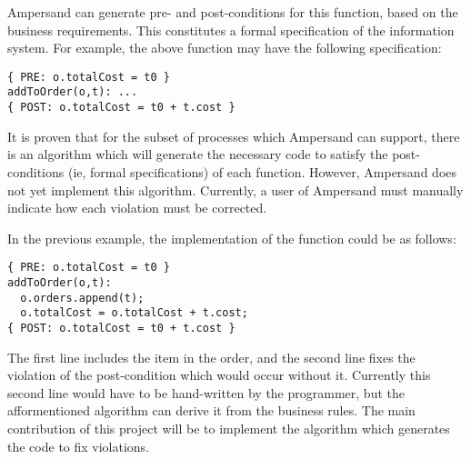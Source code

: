 \documentclass[12pt]{report}
\begin{document}
Ampersand can generate pre- and post-conditions for this function, based on the
business requirements. This constitutes a formal specification of the
information system. For example, the above function may have the following specification:

\begin{verbatim}
{ PRE: o.totalCost = t0 } 
addToOrder(o,t): ...
{ POST: o.totalCost = t0 + t.cost } 
\end{verbatim}

It is proven  %
%
that for the subset of processes which Ampersand can support, there is an
algorithm which will generate the necessary code to satisfy the post-conditions
(ie, formal specifications) of each function. However, Ampersand does not yet
implement this algorithm. Currently, a user of Ampersand must manually indicate
how each violation must be corrected.

In the previous example, the implementation of the
function could be as follows: 

\begin{verbatim}
{ PRE: o.totalCost = t0 } 
addToOrder(o,t): 
  o.orders.append(t);
  o.totalCost = o.totalCost + t.cost;
{ POST: o.totalCost = t0 + t.cost } 
\end{verbatim}

The first line includes the item in the order, and the second line fixes the
violation of the post-condition which would occur without it. Currently this
second line would have to be hand-written by the programmer, but the
afformentioned  algorithm can derive it from the business rules. The main
contribution of this project will be to implement the algorithm which generates
the code to fix violations.
\end{document}
